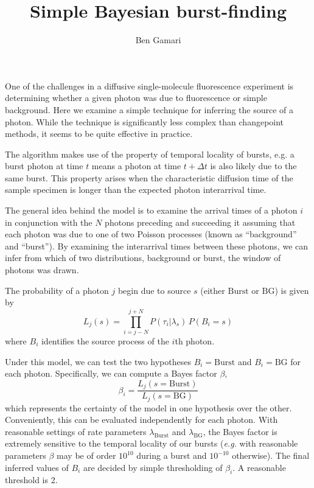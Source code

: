 \documentclass{article}
\title{Simple Bayesian burst-finding}
\author{Ben Gamari}
\newcommand{\lburst}{\ensuremath{\lambda_\mathrm{Burst}}}
\newcommand{\lbg}{\ensuremath{\lambda_\mathrm{BG}}}
\begin{document}
\maketitle

One of the challenges in a diffusive single-molecule fluorescence
experiment is determining whether a given photon was due to
fluorescence or simple background. Here we examine a simple technique
for inferring the source of a photon. While the technique is
significantly less complex than changepoint
methods\cite{watkins2005,ensign2010}, it seems to be quite effective
in practice.

The algorithm makes use of the property of temporal locality of
bursts, e.g. a burst photon at time $t$ means a photon at time $t +
\Delta t$ is also likely due to the same burst. This property arises
when the characteristic diffusion time of the sample specimen is 
longer than the expected photon interarrival time.

The general idea behind the model is to examine the arrival times of a
photon $i$ in conjunction with the $N$ photons preceding and
succeeding it assuming that each photon was due to one of two Poisson
processes (known as ``background'' and ``burst''). By examining the
interarrival times between these photons, we can infer from which of
two distributions, background or burst, the window of photons was
drawn.

The probability of a photon $j$ begin due to source $s$ (either
$\mathrm{Burst}$ or $\mathrm{BG}$) is given by
\begin{equation}
  L_j(s) = \prod_{i=j-N}^{j+N} P(\tau_i \vert \lambda_s)\, P(B_i = s)
\end{equation}
where $B_i$ identifies the source process of the $i$th photon.

Under this model, we can test the two hypotheses $B_i =
\mathrm{Burst}$ and $B_i = \mathrm{BG}$ for each photon. Specifically,
we can compute a Bayes factor $\beta$,
\begin{equation}
  \beta_i = \frac{L_j(s=\mathrm{Burst})}{L_j(s=\mathrm{BG})}
\end{equation}
which represents the certainty of the model in one hypothesis over the
other. Conveniently, this can be evaluated independently for each
photon.  With reasonable settings of rate parameters $\lburst$ and
$\lbg$, the Bayes factor is extremely sensitive to the temporal
locality of our bursts ({\it e.g.} with reasonable parameters $\beta$
may be of order $10^{10}$ during a burst and $10^{-10}$
otherwise). The final inferred values of $B_i$ are decided by simple
thresholding of $\beta_i$. A reasonable threshold is 2.
\end{document}
